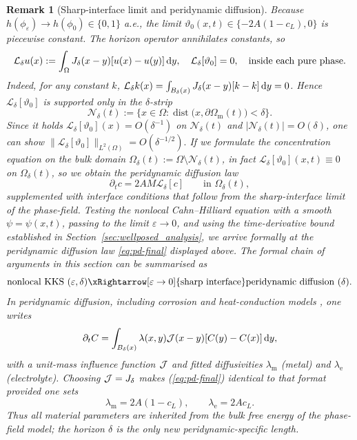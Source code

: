 \documentclass[]{article}
\newtheorem{remark}{Remark}[section]
\newcommand{\dy}{\,\textup{d}y}
\begin{document}
\begin{remark}[Sharp-interface limit and peridynamic diffusion]
	\medskip
	\noindent
	Because \(h(\phi_\varepsilon)\to h(\phi_0)\in\{0,1\}\) a.e., the limit
	\(
	\vartheta_0(x,t)\in\{-2A(1-c_L),0\}
	\)
	is piecewise constant.  The horizon operator annihilates constants, so
	\[
	\mathcal L_\delta u(x)
	:=\int_{\Omega}J_{\delta}(x-y)[u(x)-u(y)]\dy,
	\quad \mathcal L_\delta[\vartheta_0]=0,\quad\text{inside each pure phase}.
	\] 
	Indeed, for any constant $k$,
	$\mathcal L_\delta k(x)=\int_{B_\delta(x)} J_\delta(x-y)[k-k]\dy=0$.
	Hence $\mathcal L_\delta[\vartheta_0]$ is supported only in the
	$\delta$-strip 
	\[
	\mathcal N_\delta(t)
	:=\bigl\{x\in\Omega:
	\operatorname{dist}\bigl(x,\partial\Omega_{\mathrm m}(t)\bigr)
	<\delta\bigr\}.
	\]
	Since it holds \(\mathcal L_\delta[\vartheta_0](x)=O(\delta^{-1})\) on
	\(\mathcal N_\delta(t)\) and \(|\mathcal N_\delta(t)|=O(\delta)\), one can show $
	\|\mathcal L_\delta[\vartheta_0]\|_{L^{2}(\Omega)}
	= O(\delta^{-1/2}).
	$
	If we formulate the concentration equation on the
	\emph{bulk domain}  
	\(\displaystyle\Omega_\delta(t):=\Omega\setminus\mathcal N_\delta(t)\),
	in fact
	\(\mathcal L_\delta[\vartheta_0](x,t)\equiv0\) on
	\(\Omega_\delta(t)\), so we obtain the peridynamic diffusion law
	\begin{equation}
		\partial_t c
		= 2AM\mathcal L_\delta[c]
		\qquad\text{in } \Omega_\delta(t),
		\label{eq:pd-final}
	\end{equation}
	supplemented with interface conditions that follow from the sharp-interface
	limit of the phase-field. Testing the nonlocal Cahn--Hilliard equation with a smooth $\psi=\psi(x,t)$, passing to the limit $\varepsilon\to0$, and using the
	time-derivative bound established in Section~\ref{sec:wellposed_analysis}, we arrive formally at the peridynamic diffusion law \eqref{eq:pd-final} displayed above. The formal chain of arguments in this section can be summarised as
	\[
	\text{nonlocal KKS }(\varepsilon,\delta)
	\xRightarrow[\varepsilon\to0]{\text{sharp  interface}}
	\text{peridynamic diffusion }(\delta).
	\]
	In peridynamic diffusion, including corrosion and heat-conduction models
	\cite{bobaru2012heat,zeleke2021review}, one writes
	$$\partial_t C=\int_{B_\delta(x)}\lambda(x,y){\cal J}(x-y)[C(y)-C(x)]\dy,$$
	with a unit-mass influence function ${\cal J}$ and fitted diffusivities
	$\lambda_{\mathrm m}$ (metal) and $\lambda_{\mathrm e}$ (electrolyte).
	Choosing ${\cal J}=J_\delta$ makes (\ref{eq:pd-final}) identical to that
	format provided one sets
	\[
	\lambda_{\mathrm m}=2A(1-c_L),
	\qquad
	\lambda_{\mathrm e}=2Ac_L.
	\]
	Thus all material parameters are inherited from the bulk free energy of
	the phase-field model; the horizon $\delta$ is the only new
	peridynamic-specific length.
\end{remark}
\end{document}
